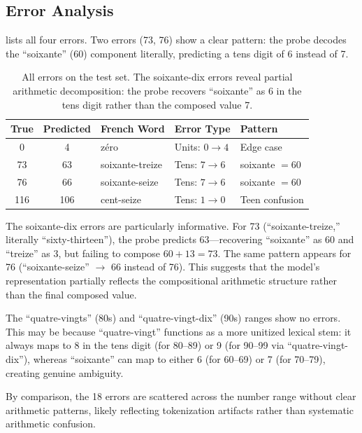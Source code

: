 \subsection{Error Analysis}
\label{sec:errors}

 lists all four \francefr errors. Two errors (73, 76) show a clear pattern: the probe decodes the ``soixante'' (60) component literally, predicting a tens digit of 6 instead of 7.

\begin{table}[t]
    \centering
    \caption{All \francefr errors on the test set. The soixante-dix errors reveal partial arithmetic decomposition: the probe recovers ``soixante'' as 6 in the tens digit rather than the composed value 7.}
    \begin{tabular}{@{}cclll@{}}
        \toprule
        \textbf{True} & \textbf{Predicted} & \textbf{French Word} & \textbf{Error Type} & \textbf{Pattern} \\
        \midrule
        0   & 4   & z\'ero               & Units: $0 \to 4$  & Edge case \\
        73  & 63  & soixante-treize      & Tens: $7 \to 6$   & soixante $= 60$ \\
        76  & 66  & soixante-seize       & Tens: $7 \to 6$   & soixante $= 60$ \\
        116 & 106 & cent-seize           & Tens: $1 \to 0$   & Teen confusion \\
        \bottomrule
    \end{tabular}
    \label{tab:errors_french}
\end{table}

The soixante-dix errors are particularly informative. For 73 (``soixante-treize,'' literally ``sixty-thirteen''), the probe predicts 63---recovering ``soixante'' as 60 and ``treize'' as 3, but failing to compose $60+13=73$. The same pattern appears for 76 (``soixante-seize'' $\to$ 66 instead of 76). This suggests that the model's representation partially reflects the compositional arithmetic structure rather than the final composed value.

The ``quatre-vingts'' (80s) and ``quatre-vingt-dix'' (90s) ranges show no errors. This may be because ``quatre-vingt'' functions as a more unitized lexical stem: it always maps to 8 in the tens digit (for 80--89) or 9 (for 90--99 via ``quatre-vingt-dix''), whereas ``soixante'' can map to either 6 (for 60--69) or 7 (for 70--79), creating genuine ambiguity.

By comparison, the 18 \digits errors are scattered across the number range without clear arithmetic patterns, likely reflecting tokenization artifacts rather than systematic arithmetic confusion.
